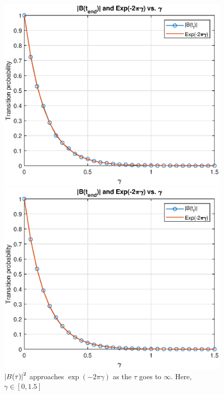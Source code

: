 \documentclass{article}
\theoremstyle{definition}
\begin{document}
\begin{figure}[!htb]
\begin{minipage}{0.49\textwidth}
		\includegraphics[width=\textwidth]{t200.eps}
		\caption{$\tau\in [-200,400]$}
		\includegraphics[width=\textwidth]{t400.eps}
		\caption{$\tau\in [-400,400]$}
	\end{minipage}
	\caption{$\abs{B(\tau)}^2$ approaches $\exp(-2\pi\gamma)$ as the $\tau$ goes to $\infty$. Here, $\gamma \in [0,1.5]$}
	\label{fig:tau_Infty}
\end{figure}
\end{document}
